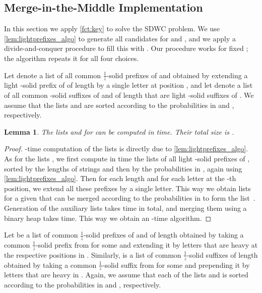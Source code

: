 \documentclass{article}
\theoremstyle{plain}
\newtheorem{lemma}[theorem]{Lemma}
\theoremstyle{definition}
\newcommand{\SDWC}{\textsc{SDWC}\xspace}
\newcommand{\fr}{\ensuremath{\frac1z}}
\newcommand{\mayqed}{}
\begin{document}
    \subsection{Merge-in-the-Middle Implementation}
    In this section we apply \cref{fct:key} to solve the \SDWC problem.
    We use \cref{lem:lightprefixes_algo} to generate all candidates for  and ,
    and we apply a divide-and-conquer procedure to fill this with .
    Our procedure works for fixed ; the algorithm repeats it for all four choices.
    
      Let  denote a list of all common \fr-solid prefixes of  and  obtained by extending
      a light -solid prefix of  of length  by a single letter  at position ,
      and let  denote a list of all common -solid suffixes of  and  of length  that are light -solid suffixes of .  We assume that the lists  and  are sorted according to the probabilities in  and , respectively.


   \begin{lemma}\label{lem:L_R}
      The lists  and  for  can be computed in  time.
      Their total size is .
    \end{lemma}
      \begin{proof}
        -time computation of the lists  is directly due to \cref{lem:lightprefixes_algo}.
        As for the lists , we first compute in  time the lists of all light -solid prefixes of , sorted by the lengths of strings and then by the probabilities in , again using \cref{lem:lightprefixes_algo}.
        Then for each length  and for each letter  at the -th position, we extend all these prefixes by a single letter.
        This way we obtain  lists for a given  that can be merged according to the probabilities in  to form the list~.
        Generation of the auxiliary lists takes  time in total,
        and merging them using a binary heap takes  time.
        This way we obtain an -time algorithm.
      \mayqed\end{proof}

      Let  be a list of common \fr-solid prefixes of  and  of length 
      obtained by taking a common \fr-solid prefix from  for some 
      and extending it by  letters that are heavy at the respective positions in .
      Similarly,  is a list of common \fr-solid suffixes of length 
      obtained by taking a common \fr-solid suffix from  for some 
      and prepending it by  letters that are heavy in .
      Again, we assume that each of the lists  and  is sorted according to the probabilities in  and , respectively.
      
\end{document}

